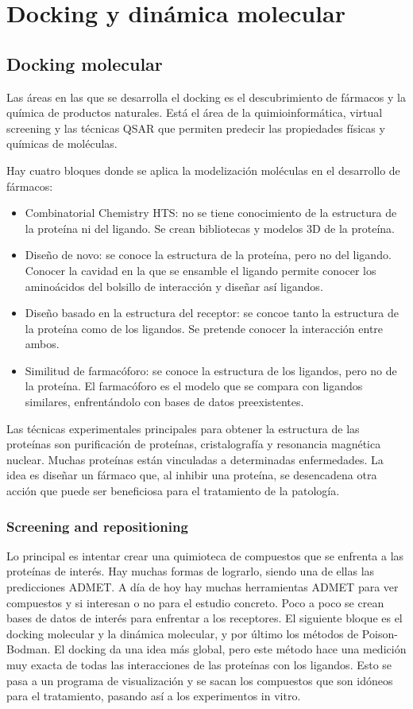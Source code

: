 \part{Docking y dinámica molecular}
\chapter{Docking molecular}
Las áreas en las que se desarrolla el docking es el descubrimiento de fármacos y la química de productos naturales. Está el área de la quimioinformática, virtual screening y las técnicas QSAR que permiten predecir las propiedades físicas y químicas de moléculas. 

Hay cuatro bloques donde se aplica la modelización moléculas en el desarrollo de fármacos:
\begin{itemize}
\item Combinatorial Chemistry HTS: no se tiene conocimiento de la estructura de la proteína ni del ligando. Se crean bibliotecas y modelos 3D de la proteína.
\item Diseño de novo: se conoce la estructura de la proteína, pero no del ligando. Conocer la cavidad en la que se ensamble el ligando permite conocer los aminoácidos del bolsillo de interacción y diseñar así ligandos.
\item Diseño basado en la estructura del receptor: se concoe tanto la estructura de la proteína como de los ligandos. Se pretende conocer la interacción entre ambos.
\item Similitud de farmacóforo: se conoce la estructura de los ligandos, pero no de la proteína. El farmacóforo es el modelo que se compara con ligandos similares, enfrentándolo con bases de datos preexistentes.
\end{itemize}

Las técnicas experimentales principales para obtener la estructura de las proteínas son purificación de proteínas, cristalografía y resonancia magnética nuclear. Muchas proteínas están vinculadas a determinadas enfermedades. La idea es diseñar un fármaco que, al inhibir una proteína, se desencadena otra acción que puede ser beneficiosa para el tratamiento de la patología. 

\section{Screening and repositioning}
Lo principal es intentar crear una quimioteca de compuestos que se enfrenta a las proteínas de interés. Hay muchas formas de lograrlo, siendo una de ellas las predicciones ADMET. A día de hoy hay muchas herramientas ADMET para ver compuestos y si interesan o no para el estudio concreto. Poco a poco se crean bases de datos de interés para enfrentar a los receptores. El siguiente bloque es el docking molecular y la dinámica molecular, y por último los métodos de Poison-Bodman. El docking da una idea más global, pero este método hace una medición muy exacta de todas las interacciones de las proteínas con los ligandos. Esto se pasa a un programa de visualización y se sacan los compuestos que son idóneos para el tratamiento, pasando así a los experimentos in vitro.


